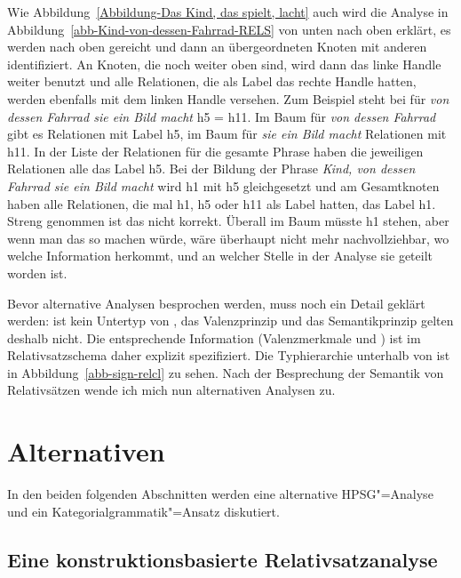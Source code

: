 Wie Abbildung~\ref{Abbildung-Das Kind, das spielt, lacht} auch wird die Analyse in
Abbildung~\ref{abb-Kind-von-dessen-Fahrrad-RELS} von unten 
nach oben erklärt, \dash es werden \ltopwe nach oben gereicht und dann an übergeordneten Knoten mit
anderen \ltopwen identifiziert. An Knoten, die noch weiter oben sind, wird dann das linke Handle
weiter benutzt und alle Relationen, die als Label das rechte Handle hatten, werden ebenfalls mit dem
linken Handle versehen. Zum Beispiel steht bei \ltop für \emph{von dessen Fahrrad sie ein Bild
  macht} h5 = h11. Im Baum für \emph{von dessen Fahrrad} gibt es Relationen mit Label h5, im Baum
für \emph{sie ein Bild macht} Relationen mit h11. In der Liste der Relationen für die gesamte Phrase
haben die jeweiligen Relationen alle das Label h5. Bei der Bildung der Phrase \emph{Kind, von dessen
  Fahrrad sie ein Bild macht} wird h1 mit h5 gleichgesetzt und am Gesamtknoten haben alle
Relationen, die mal h1, h5 oder h11 als Label hatten, das Label h1. Streng genommen ist das nicht
korrekt. Überall im Baum müsste h1 stehen, aber wenn man das so machen würde, wäre überhaupt nicht
mehr nachvollziehbar, wo welche Information herkommt, und an welcher Stelle in der Analyse sie
geteilt worden ist.

Bevor alternative Analysen besprochen werden, muss noch ein Detail geklärt werden:
 ist kein Untertyp von , das Valenzprinzip und das
Semantikprinzip gelten deshalb nicht. Die entsprechende Information (Valenzmerkmale und \contw) ist
im Relativsatzschema daher explizit spezifiziert. Die Typhierarchie unterhalb von  ist
in Abbildung~\ref{abb-sign-relcl} zu sehen. Nach der Besprechung der Semantik von Relativsätzen
wende ich mich nun alternativen Analysen zu.



\section{Alternativen}

In den beiden folgenden Abschnitten werden eine alternative HPSG"=Analyse und ein
Kategorialgrammatik"=Ansatz diskutiert.

\subsection{Eine konstruktionsbasierte Relativsatzanalyse}
\label{sec-konstruktionsbasierte-rs}


